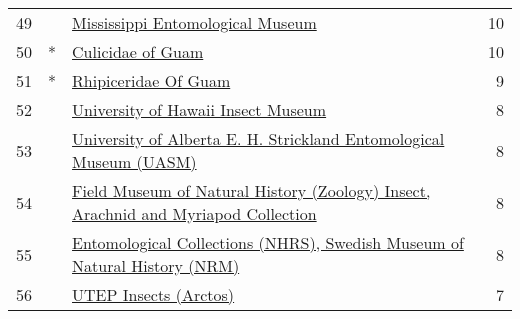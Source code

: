\begin{longtable}{llp{5in}r}
49 &    &                                                                                                                                                                 \href{https://www.gbif.org/dataset/9b12d595-11ea-4128-88ea-ed378eb9ea9a}{Mississippi Entomological Museum} &            10 \\
50 &  * &                                                                                                                                                                                \href{https://www.gbif.org/dataset/88488cba-2f64-4fbe-a0fa-ca99dd98ae55}{Culicidae of Guam} &            10 \\
51 &  * &                                                                                                                                                                             \href{https://www.gbif.org/dataset/25a9c8d4-a695-4a1a-88b1-080201b8e616}{Rhipiceridae Of Guam} &             9 \\
52 &    &                                                                                                                                                               \href{https://www.gbif.org/dataset/47576eae-c976-4c45-adc2-35d895bb1cbb}{University of Hawaii Insect Museum} &             8 \\
53 &    &                                                                                                                               \href{https://www.gbif.org/dataset/8971dfba-f762-11e1-a439-00145eb45e9a}{University of Alberta E. H. Strickland Entomological Museum (UASM)} &             8 \\
54 &    &                                                                                                               \href{https://www.gbif.org/dataset/7931dcab-94f1-46ce-8092-56e4335423de}{Field Museum of Natural History (Zoology) Insect, Arachnid and Myriapod Collection} &             8 \\
55 &    &                                                                                                                        \href{https://www.gbif.org/dataset/9940af5a-3271-4e6a-ad71-ced986b9a9a5}{Entomological Collections (NHRS), Swedish Museum of Natural History (NRM)} &             8 \\
56 &    &                                                                                                                                                                            \href{https://www.gbif.org/dataset/297ecc07-da20-4ebf-9f41-4f80330b4b33}{UTEP Insects (Arctos)} &             7 \\

\end{longtable}
